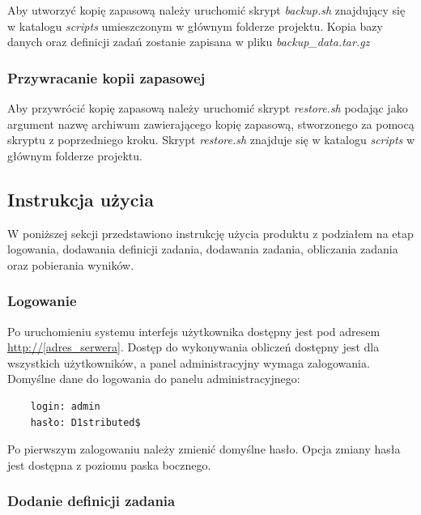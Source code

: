 \documentclass[a4paper,11pt,twoside]{report}
\theoremstyle{definition}
\begin{document}
            Aby utworzyć kopię zapasową należy uruchomić skrypt \textit{backup.sh} znajdujący się w katalogu \textit{scripts} umieszczonym w głównym folderze projektu. 
            Kopia bazy danych oraz definicji zadań zostanie zapisana w pliku \textit{backup\_data.tar.gz}
            
        \subsubsection{Przywracanie kopii zapasowej}

            Aby przywrócić kopię zapasową należy uruchomić skrypt \textit{restore.sh} podając jako argument nazwę archiwum zawierającego kopię zapasową, stworzonego za pomocą skryptu z poprzedniego kroku. Skrypt \textit{restore.sh} znajduje się w katalogu \textit{scripts} w głównym folderze projektu.
            
    \subsection{Instrukcja użycia}
        W poniższej sekcji przedstawiono instrukcję użycia produktu z podziałem na etap logowania, dodawania definicji zadania, dodawania zadania, obliczania zadania oraz pobierania wyników.
        
        \subsubsection{Logowanie}
        
        Po uruchomieniu systemu interfejs użytkownika dostępny jest pod adresem \url{http://[adres_serwera]}. Dostęp do wykonywania obliczeń dostępny jest dla wszystkich użytkowników, a panel administracyjny wymaga zalogowania.
        Domyślne dane do logowania do panelu administracyjnego:

        \begin{verbatim}
    login: admin
    hasło: D1stributed$
        \end{verbatim}


        Po pierwszym zalogowaniu należy zmienić domyślne hasło. Opcja zmiany hasła jest dostępna z poziomu paska bocznego.
        
        \subsubsection{Dodanie definicji zadania}
        \label{distributed-task-definition-add-guide}
        
\end{document}

